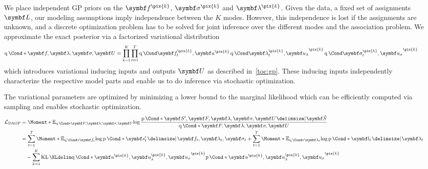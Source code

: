 We place independent GP priors on the $\mat{f}^{\pix{k}}$, $\mat{\sigma}^{\pix{k}}$ and $\mat{\lambda}^{\pix{k}}$.
Given the data, a fixed set of assignments $\mat{L}$, our modeling assumptions imply independence between the $K$ modes.
However, this independence is lost if the assignments are unknown, and a discrete optimization problem has to be solved for joint inference over the different modes and the association problem.
We approximate the exact posterior via a factorized variational distribution
\begin{align}
    \Variat*{\mat{f}, \mat{\lambda}, \mat{\sigma}, \mat{U}} & =
    \prod_{k=1}^K\prod_{t=1}^T \Variat{\mat{f}_t^{\pix{k}}, \mat{u}^{\pix{k}}} \Variat{\mat{\lambda}_t^{\pix{k}}, \mat{u}_\lambda}^{\pix{k}} \Variat{\mat{\sigma}_t^{\pix{k}}, \mat{u}_\sigma}^{\pix{k}}
\end{align}
which introduces variational inducing inputs and outputs $\mat{U}$ as described in~\cref{toc:gp}.
These inducing inputs independently characterize the respective model parts and enable us to do inference via stochastic optimization.

The variational parameters are optimized by minimizing a lower bound to the marginal likelihood which can be efficiently computed via sampling and enables stochastic optimization.
\begin{equation}
    \begin{split}
        \label{eq:interpretable_rl:variational_bound}
        \Lc_{\text{DAGP}} &= \Moment*{\E_{\Variat*{\mat{F}, \mat{\lambda}, \mat{\sigma}, \mat{U}}}}{\log\frac{\Prob*{\mat{S}^\prime, \mat{F}, \mat{\lambda}, \mat{\sigma}, \mat{U} \given \mat{\hat{S}}}}{\Variat*{\mat{F}, \mat{\lambda}, \mat{\sigma}, \mat{U}}}} \\
        &=
        \sum_{t=1}^T \Moment*{\E_{\Variat*{\mat{f}_t}}}{\log \Prob*{\mat{s}^\prime_t \given \mat{f}_t, \mat{\lambda}_t, \mat{\sigma}_t}}
        + \sum_{t=1}^T \Moment*{\E_{\Variat*{\mat{\lambda}_t}}}{\log \Prob*{\mat{l}_t \given \mat{\lambda}_t}} \\
        &\quad
        - \sum_{k=1}^K \KL{\Variat*{\mat{u}^{\pix{k}}, \mat{u}_\lambda^{\pix{k}}, \mat{u}_\sigma}^{\pix{k}}}{\Prob*{\mat{u}^{\pix{k}}, \mat{u}_\lambda^{\pix{k}}, \mat{u}_\sigma}^{\pix{k}}}
    \end{split}
\end{equation}

